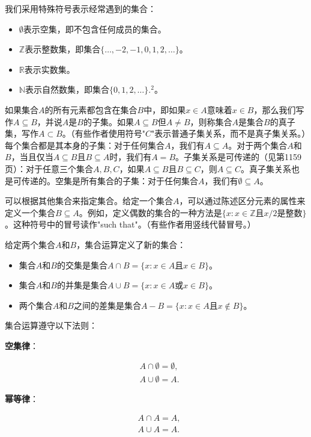 \documentclass[lang=cn,newtx,10pt,scheme=chinese]{elegantbook}
\begin{document}
我们采用特殊符号表示经常遇到的集合：

\begin{itemize}
\item $\emptyset$表示空集，即不包含任何成员的集合。
\item $\mathbb{Z}$表示整数集，即集合$\{\ldots,-2,-1,0,1,2,\ldots\}$。
\item $\mathbb{R}$表示实数集。
\item $\mathbb{N}$表示自然数集，即集合$\{0,1,2,\ldots\} .^2$。
\end{itemize}

如果集合$A$的所有元素都包含在集合$B$中，即如果$x \in A$意味着$x \in B$，那么我们写作$A \subseteq B$，并说$A$是$B$的子集。如果$A \subseteq B$但$A \neq B$，则称集合$A$是集合$B$的真子集，写作$A \subset B$。（有些作者使用符号"$C$"表示普通子集关系，而不是真子集关系。）每个集合都是其本身的子集：对于任何集合$A$，我们有$A \subseteq A$。对于两个集合$A$和$B$，当且仅当$A \subseteq B$且$B \subseteq A$时，我们有$A=B$。子集关系是可传递的（见第1159页）：对于任意三个集合$A,B,C$，如果$A \subseteq B$且$B \subseteq C$，则$A \subseteq C$。真子集关系也是可传递的。空集是所有集合的子集：对于任何集合$A$，我们有$\emptyset \subseteq A$。

可以根据其他集合来指定集合。给定一个集合$A$，可以通过陈述区分元素的属性来定义一个集合$B\subseteq A$。例如，定义偶数的集合的一种方法是$\{x: x \in \mathbb{Z}$且$x / 2$是整数$\}$。这种符号中的冒号读作"such that"。（有些作者用竖线代替冒号。）

给定两个集合$A$和$B$，集合运算定义了新的集合：

\begin{itemize}
\item 集合$A$和$B$的交集是集合$A \cap B=\{x: x \in A$且$x \in B\}$。
\item 集合$A$和$B$的并集是集合$A \cup B=\{x: x \in A$或$x \in B\}$。
\item 两个集合$A$和$B$之间的差集是集合$A-B=\{x: x \in A$且$x \notin B\}$。
\end{itemize}

集合运算遵守以下法则：

\textbf{空集律}：

$$
\begin{aligned}
& A \cap \emptyset=\emptyset, \\
& A \cup \emptyset=A .
\end{aligned}
$$

\textbf{幂等律}：

$$
\begin{aligned}
& A \cap A=A, \\
& A \cup A=A .
\end{aligned}
$$
\end{document}
